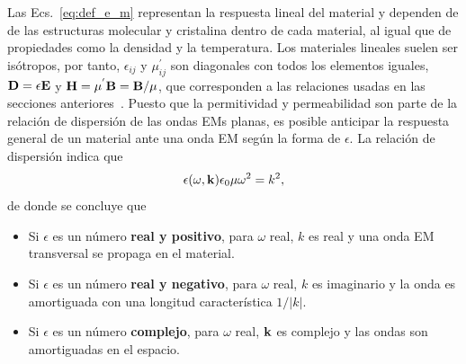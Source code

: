 Las Ecs.~\eqref{eq:def_e_m} representan la respuesta lineal del material y dependen de de las estructuras molecular y cristalina dentro de cada material, al igual que de propiedades como la densidad y la temperatura. Los materiales lineales suelen ser isótropos, por tanto, $\epsilon_{ij}$ y $\mu^{'}_{ij}$ son diagonales con todos los elementos iguales, $\vb{D}=\epsilon\vb{E}$ y $\vb{H}=\mu^{'}\vb{B}=\vb{B}/\mu$, que corresponden a las relaciones usadas en las secciones anteriores~\cite{jackson1999electrodynamics}. Puesto que la permitividad y permeabilidad son parte de la relación de dispersión de las ondas EMs planas, es posible anticipar la respuesta general de un material ante una onda EM según la forma de $\epsilon$. La relación de dispersión indica que~\cite{kittel1996introduction}
\begin{equation}
\epsilon(\omega,\vb{k})\epsilon_{0}\mu\omega^{2}=k^{2},
\end{equation}
de donde se concluye que~\cite{kittel1996introduction}
\begin{itemize}
	\item Si $\epsilon$ es un número \textbf{real y positivo}, para $\omega$ real, $k$ es real y una onda EM transversal se propaga en el material.
	\item Si $\epsilon$ es un número \textbf{real y negativo}, para $\omega$ real, $k$ es imaginario y la onda es amortiguada con una longitud característica $1/|k|$.
	\item Si $\epsilon$ es un número \textbf{complejo}, para $\omega$ real, $\vb{k}$ es complejo y las ondas son amortiguadas en el espacio.
\end{itemize}